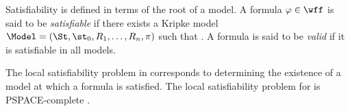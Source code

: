 Satisfiability is defined in terms of the root of a model. A formula $\varphi
\in \wff$ is said to be \emph{satisfiable} if there exists a Kripke model
$\Model = (\St, \st_0, R_1, \ldots, R_n, \pi)$ such that
. A formula is said to be \emph{valid} if it is
satisfiable in all models.

The local satisfiability problem in  corresponds to determining
the existence of a model at which a formula is satisfied. The local
satisfiability problem for  is PSPACE-complete \cite{Spaan:coml}.
